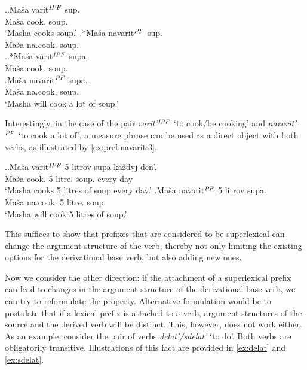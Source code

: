 \ex.\label{ex:pref:navarit:1}\ag.\label{ex:varit:1}Ma\v{s}a varit$^{\mathit{IPF}}$ sup.\\
Ma\v{s}a cook. soup.\\
\vspace{0.5em}
`Masha cooks soup.'
\bg.*Ma\v{s}a navarit$^{\mathit{PF}}$ sup.\label{ex:navarit1}\\
Ma\v{s}a na.cook. soup.\\

\ex.\label{ex:pref:navarit:2}\ag.*Ma\v{s}a varit$^{\mathit{IPF}}$ supa.\label{ex:varit2}\\
Ma\v{s}a cook. soup.\\
\bg.\label{ex:navarit2}Ma\v{s}a navarit$^{\mathit{PF}}$ supa.\\
Ma\v{s}a na.cook. soup.\\
\vspace{0.5em}
`Masha will cook a lot of soup.'

Interestingly, in the case of the pair \textit{varit'}$^{\mathit{IPF}}$ `to cook/be cooking' and \textit{navarit'}$^{\mathit{PF}}$ `to cook a lot of', a measure phrase can be used as a direct object with both verbs, as illustrated by \ref{ex:pref:navarit:3}.

\ex.\label{ex:pref:navarit:3}\ag.\label{ex:varit3}Ma\v{s}a varit$^{\mathit{IPF}}$ 5 litrov supa ka\v{z}dyj den'.\\
Ma\v{s}a cook. 5 litre. soup. every day\\
\vspace{0.5em}
`Masha cooks 5 litres of soup every day.'
\bg.\label{ex:navarit3}Ma\v{s}a navarit$^{\mathit{PF}}$ 5 litrov supa.\\
Ma\v{s}a na.cook. 5 litre. soup.\\
\vspace{0.5em}
`Masha will cook 5 litres of soup.'

This suffices to show that prefixes that are considered to be superlexical can change the argument structure of the verb, thereby not only limiting the existing options for the derivational base verb, but also adding new ones.

Now we consider the other direction: if the attachment of a superlexical prefix can lead to changes in the argument structure of the derivational base verb, we can try to reformulate the property. Alternative formulation would be to postulate that if a lexical prefix is attached to a verb, argument structures of the source and the derived verb will be distinct. This, however, does not work either. As an example, consider the pair of verbs \textit{delat'/sdelat'} `to do'. Both verbs are obligatorily transitive. Illustrations of this fact are provided in \ref{ex:delat} and \ref{ex:sdelat}.

